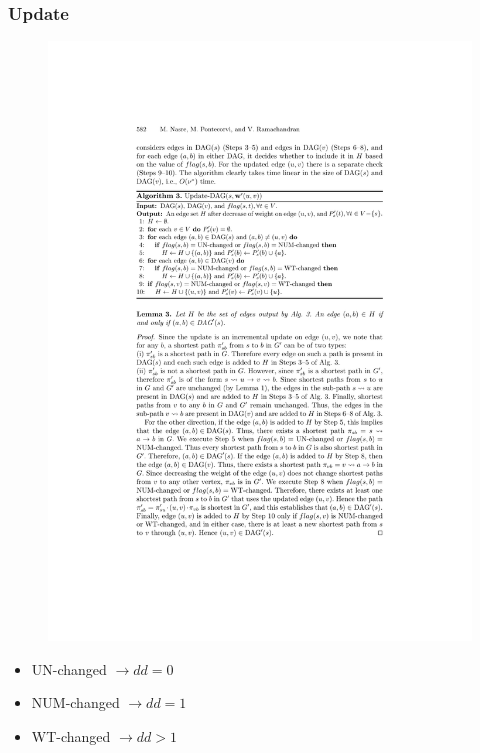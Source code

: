 \begin{frame}
  \frametitle{\spdag Update}

  \begin{figure}[H]
    \centering
    \includegraphics[width=\textwidth]{imgs/npr14-algo3}
  \end{figure}

  \begin{itemize}
    \item UN-changed $\rightarrow dd=0$
    \item NUM-changed $\rightarrow dd=1$
    \item WT-changed $\rightarrow dd>1$
  \end{itemize}
\end{frame}


